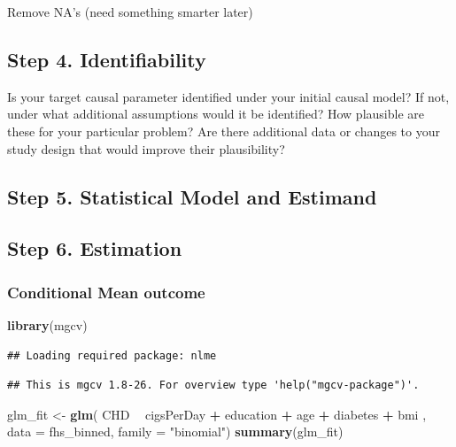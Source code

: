 \documentclass[]{article}
\newenvironment{Shaded}{\begin{snugshade}}{\end{snugshade}}
\newcommand{\KeywordTok}[1]{\textcolor[rgb]{0.13,0.29,0.53}{\textbf{#1}}}
\newcommand{\DataTypeTok}[1]{\textcolor[rgb]{0.13,0.29,0.53}{#1}}
\newcommand{\StringTok}[1]{\textcolor[rgb]{0.31,0.60,0.02}{#1}}
\newcommand{\OperatorTok}[1]{\textcolor[rgb]{0.81,0.36,0.00}{\textbf{#1}}}
\newcommand{\NormalTok}[1]{#1}
\begin{document}
Remove NA's (need something smarter later)

\subsection{Step 4. Identifiability}\label{step-4.-identifiability}

Is your target causal parameter identified under your initial causal
model? If not, under what additional assumptions would it be identified?
How plausible are these for your particular problem? Are there
additional data or changes to your study design that would improve their
plausibility?

\subsection{Step 5. Statistical Model and
Estimand}\label{step-5.-statistical-model-and-estimand}

\subsection{Step 6. Estimation}\label{step-6.-estimation}

\subsubsection{Conditional Mean outcome}\label{conditional-mean-outcome}

\begin{Shaded}
\begin{Highlighting}[]
\KeywordTok{library}\NormalTok{(mgcv)}
\end{Highlighting}
\end{Shaded}

\begin{verbatim}
## Loading required package: nlme
\end{verbatim}

\begin{verbatim}
## This is mgcv 1.8-26. For overview type 'help("mgcv-package")'.
\end{verbatim}

\begin{Shaded}
\begin{Highlighting}[]
\NormalTok{glm_fit <-}\StringTok{ }\KeywordTok{glm}\NormalTok{( CHD }\OperatorTok{~}\StringTok{ }\NormalTok{cigsPerDay }\OperatorTok{+}\StringTok{ }\NormalTok{education }\OperatorTok{+}\StringTok{ }\NormalTok{age }\OperatorTok{+}\StringTok{ }\NormalTok{diabetes }\OperatorTok{+}\StringTok{ }\NormalTok{bmi , }\DataTypeTok{data =}\NormalTok{ fhs_binned, }\DataTypeTok{family =} \StringTok{"binomial"}\NormalTok{)}
\KeywordTok{summary}\NormalTok{(glm_fit)}
\end{Highlighting}
\end{Shaded}
\end{document}
